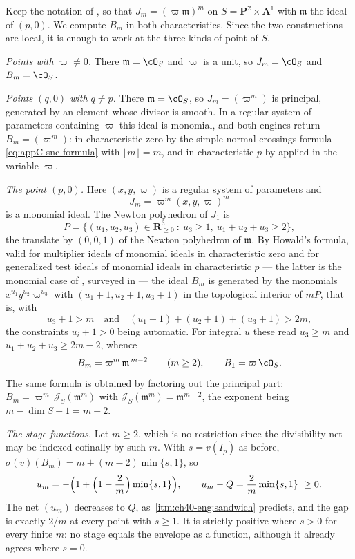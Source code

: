 \begin{example}
\label{ex:ch40-p2-engines}
Keep the notation of , so that
$J_m=(\varpi\mathfrak m)^m$ on $S=\mathbf P^2\times\mathbf A^1$ with
$\mathfrak m$ the ideal of $(p,0)$.  We compute $B_m$ in both
characteristics.  Since the two constructions are local, it is enough to
work at the three kinds of point of $S$.

\emph{Points with $\varpi\ne0$.}  There $\mathfrak m=\cO_S$ and
$\varpi$ is a unit, so $J_m=\cO_S$ and $B_m=\cO_S$.

\emph{Points $(q,0)$ with $q\ne p$.}  There $\mathfrak m=\cO_S$, so
$J_m=(\varpi^m)$ is principal, generated by an element whose divisor is
smooth.  In a regular system of parameters containing $\varpi$ this ideal
is monomial, and both engines return
$B_m=(\varpi^m)$: in characteristic zero by the simple normal crossings
formula \eqref{eq:appC-snc-formula} with $\lfloor m\rfloor=m$, and in
characteristic $p$ by  applied in the
variable $\varpi$.

\emph{The point $(p,0)$.}  Here $(x,y,\varpi)$ is a regular system of
parameters and
\[
 J_m=\varpi^m(x,y,\varpi)^m
\]
is a monomial ideal.  The Newton polyhedron of $J_1$ is
\[
 P=\bigl\{(u_1,u_2,u_3)\in\mathbf R^3_{\ge0}\ :\
 u_3\ge1,\ u_1+u_2+u_3\ge2\bigr\},
\]
the translate by $(0,0,1)$ of the Newton polyhedron of
$\mathfrak m$.  By Howald's formula, valid for multiplier ideals of
monomial ideals in characteristic zero and for generalized test ideals of
monomial ideals in characteristic $p$ --- the latter is the monomial case
of \cite{HY03}, surveyed in \cite{ST12} --- the ideal
$B_m$ is generated by the monomials $x^{u_1}y^{u_2}\varpi^{u_3}$ with
$(u_1+1,u_2+1,u_3+1)$ in the topological interior of $mP$, that is, with
\[
 u_3+1>m
 \quad\text{and}\quad
 (u_1+1)+(u_2+1)+(u_3+1)>2m,
\]
the constraints $u_i+1>0$ being automatic.  For integral $u$ these read
$u_3\ge m$ and $u_1+u_2+u_3\ge2m-2$, whence
\[
 B_m=\varpi^m\,\mathfrak m^{\,m-2}
 \qquad(m\ge2),
 \qquad B_1=\varpi\,\cO_S .
\]
The same formula is obtained by factoring out the principal part:
$B_m=\varpi^m\,\mathcal J_S(\mathfrak m^m)$ with
$\mathcal J_S(\mathfrak m^m)=\mathfrak m^{m-2}$, the exponent being
$m-\dim S+1=m-2$.

\emph{The stage functions.}  Let $m\ge2$, which is no restriction since
the divisibility net may be indexed cofinally by such $m$.  With
$s=v(I_p)$ as before, $\sigma(v)(B_m)=m+(m-2)\min\{s,1\}$, so
\[
 u_m=-\Bigl(1+\Bigl(1-\frac2m\Bigr)\min\{s,1\}\Bigr),
 \qquad
 u_m-Q=\frac2m\min\{s,1\}\ \ge0 .
\]
The net $(u_m)$ decreases to $Q$, as
\,\cref{itm:ch40-eng:sandwich} predicts, and
the gap is exactly $2/m$ at every point with $s\ge1$.  It is strictly
positive where $s>0$ for every finite $m$: no stage equals the envelope
as a function, although it already agrees where $s=0$.


\end{example}
